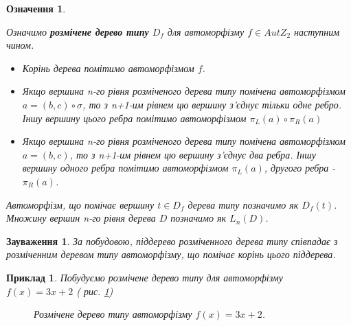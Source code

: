 \documentclass[a4paper,12pt]{article} \usepackage{a4wide}
\numberwithin{equation}{subsection}
\newtheorem{remark}{Зауваження}[subsection]
\newtheorem{definition}{Означення}[subsection]
\newtheorem{example}{Приклад}[subsection]
\begin{document}
\begin{definition}\label{marked_type_tree_def}

  Означимо {\bf розмічене дерево типу } $D_f$ для автоморфізму $f \in
  AutZ_2$ наступним чином.
  \begin{itemize}
  \item Корінь дерева помітимо автоморфізмом $f$.
  \item Якщо вершина n-го рівня розміченого дерева типу помічена
    автоморфізмом $a = (b,c)\circ\sigma$, то з n+1-им рівнем цю
    вершину з'єднує тільки одне ребро. Іншу вершину цього ребра
    помітимо автоморфізмом $\pi_L(a)\circ \pi_R(a)$
  \item Якщо вершина n-го рівня розміченого дерева типу помічена
    автоморфізмом $a = (b,c)$, то з n+1-им рівнем цю вершину з'єднує
    два ребра. Іншу вершину одного ребра помітимо автоморфізмом
    $\pi_L(a)$, другого ребра - $\pi_R(a)$.
  \end{itemize}
  Автоморфізм, що помічає вершину $t\in D_f$ дерева типу позначимо як
  $D_f(t)$.  Множину вершин n-го рівня дерева $D$ позначимо як
  $L_n(D)$.

\end{definition}

\begin{remark}\label{child_type_subtree}
  За побудовою, піддерево розміченного дерева типу співпадає з
  розміченним деревом типу автоморфізму, що помічає корінь цього
  піддерева.
\end{remark}

\begin{example}
Побудуємо розмічене дерево типу для автоморфізму $f(x)= 3x+2$ ( рис. \ref{marked_type_tree_3xp2})
\begin{figure}[h!]
\caption{Розмічене дерево типу автоморфізму $f(x)= 3x+2$.}
\label{marked_type_tree_3xp2}
\end{figure}


\end{example}
\end{document}
